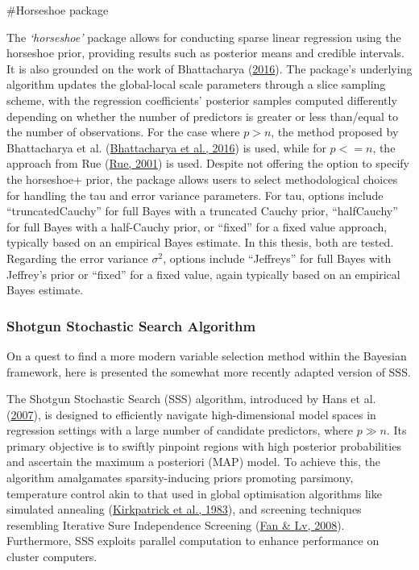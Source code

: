 \documentclass[
  11pt,
]{article}
\begin{document}
\#Horseshoe package

The \emph{`horseshoe'} package allows for conducting sparse linear
regression using the horseshoe prior, providing results such as
posterior means and credible intervals. It is also grounded on the work
of Bhattacharya (\protect\hyperlink{ref-Bhattacharya2016}{2016}). The
package's underlying algorithm updates the global-local scale parameters
through a slice sampling scheme, with the regression coefficients'
posterior samples computed differently depending on whether the number
of predictors is greater or less than/equal to the number of
observations. For the case where \(p > n\), the method proposed by
Bhattacharya et al.
(\protect\hyperlink{ref-Bhattacharya2016}{Bhattacharya et al., 2016}) is
used, while for \(p <= n\), the approach from Rue
(\protect\hyperlink{ref-Rue2001}{Rue, 2001}) is used. Despite not
offering the option to specify the horseshoe+ prior, the package allows
users to select methodological choices for handling the tau and error
variance parameters. For tau, options include ``truncatedCauchy'' for
full Bayes with a truncated Cauchy prior, ``halfCauchy'' for full Bayes
with a half-Cauchy prior, or ``fixed'' for a fixed value approach,
typically based on an empirical Bayes estimate. In this thesis, both are
tested. Regarding the error variance \(\sigma^2\), options include
``Jeffreys'' for full Bayes with Jeffrey's prior or ``fixed'' for a
fixed value, again typically based on an empirical Bayes estimate.

\subsubsection{Shotgun Stochastic Search Algorithm}

On a quest to find a more modern variable selection method within the
Bayesian framework, here is presented the somewhat more recently adapted
version of SSS.

The Shotgun Stochastic Search (SSS) algorithm, introduced by Hans et al.
(\protect\hyperlink{ref-Hans2007}{2007}), is designed to efficiently
navigate high-dimensional model spaces in regression settings with a
large number of candidate predictors, where \(p \gg n\). Its primary
objective is to swiftly pinpoint regions with high posterior
probabilities and ascertain the maximum a posteriori (MAP) model. To
achieve this, the algorithm amalgamates sparsity-inducing priors
promoting parsimony, temperature control akin to that used in global
optimisation algorithms like simulated annealing
(\protect\hyperlink{ref-Vecchi1983}{Kirkpatrick et al., 1983}), and
screening techniques resembling Iterative Sure Independence Screening
(\protect\hyperlink{ref-Fan2008}{Fan \& Lv, 2008}). Furthermore, SSS
exploits parallel computation to enhance performance on cluster
computers.
\end{document}
